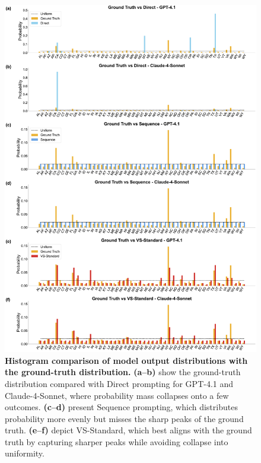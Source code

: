 \begin{figure}[!htbp]
    \centering
    \includegraphics[width=\linewidth]{figures//appendix/pre_training_distribution_comparison.pdf}
    \caption{\textbf{Histogram comparison of model output distributions with the ground-truth distribution.} 
\textbf{(a–b)} show the ground-truth distribution compared with Direct prompting for GPT-4.1 and Claude-4-Sonnet, where probability mass collapses onto a few outcomes.
\textbf{(c–d)} present Sequence prompting, which distributes probability more evenly but misses the sharp peaks of the ground truth.
\textbf{(e–f)} depict VS-Standard, which best aligns with the ground truth by capturing sharper peaks while avoiding collapse into uniformity. 
    }
    \label{fig:pre_training_distribution}
\end{figure}

